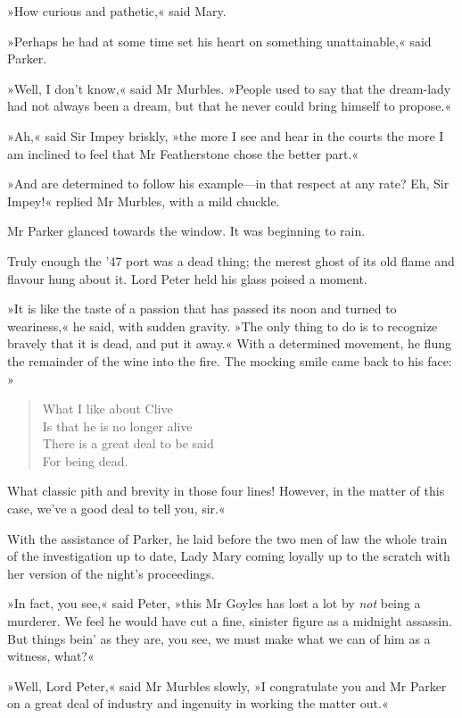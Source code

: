 »How curious and pathetic,« said Mary.

»Perhaps he had at some time set his heart on something unattainable,« said Parker.

»Well, I don't know,« said Mr Murbles. »People used to say that the dream-lady had not always been a dream, but that he never could bring himself to propose.«

»Ah,« said Sir Impey briskly, »the more I see and hear in the courts the more I am inclined to feel that Mr Featherstone chose the better part.«

»And are determined to follow his example—in that respect at any rate?  Eh, Sir Impey!« replied Mr Murbles, with a mild chuckle.

Mr Parker glanced towards the window. It was beginning to rain.

Truly enough the '47 port was a dead thing; the merest ghost of its old flame and flavour hung about it. Lord Peter held his glass poised a moment.

»It is like the taste of a passion that has passed its noon and turned to weariness,« he said, with sudden gravity. »The only thing to do is to recognize bravely that it is dead, and put it away.« With a determined movement, he flung the remainder of the wine into the fire.  The mocking smile came back to his face: 
»\begin{verse}
What I like about Clive\\
Is that he is no longer alive\longdash \\
There is a great deal to be said\\
For being dead.\\
\end{verse}

What classic pith and brevity in those four lines! However, in the matter of this case, we've a good deal to tell you, sir.«

With the assistance of Parker, he laid before the two men of law the whole train of the investigation up to date, Lady Mary coming loyally up to the scratch with her version of the night's proceedings.

»In fact, you see,« said Peter, »this Mr Goyles has lost a lot by \textit{not} being a murderer. We feel he would have cut a fine, sinister figure as a midnight assassin. But things bein' as they are, you see, we must make what we can of him as a witness, what?«

»Well, Lord Peter,« said Mr Murbles slowly, »I congratulate you and Mr Parker on a great deal of industry and ingenuity in working the matter out.«

